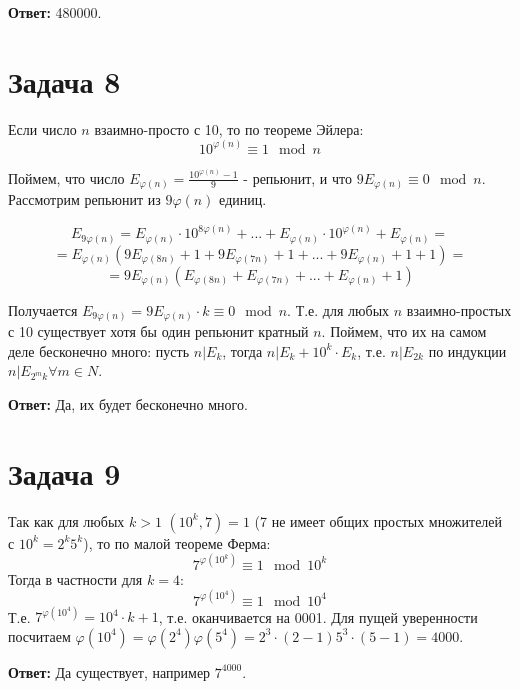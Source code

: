 \documentclass{article}
\begin{document}
		 \textbf{Ответ:} 480000.
		 
		 
		  \section {Задача 8}
		  
		  Если число $n$ взаимно-просто с 10, то по теореме Эйлера:
		  $$ 10^{\varphi(n)} \equiv 1 \mod n$$
		  
		  Поймем, что число $E_{\varphi(n)} = \frac{10^{\varphi(n)} - 1}{9}$ - репьюнит, и что $9E_{\varphi(n)} \equiv 0 \mod n$. Рассмотрим репьюнит из $9\varphi(n)$ единиц. 
		  
		  $$ E_{9\varphi(n)} = E_{\varphi(n)} \cdot 10^{8\varphi(n)} + ... + E_{\varphi(n)} \cdot 10^{\varphi(n)} + E_{\varphi(n)} = $$
		  $$=  E_{\varphi(n)} ( 9E_{\varphi(8n)} + 1 + 9E_{\varphi(7n)} + 1 + ... +  9E_{\varphi(n)} + 1 + 1) = $$
		  $$ = 9E_{\varphi(n)} (E_{\varphi(8n)} + E_{\varphi(7n)} + ... + E_{\varphi(n)} + 1)$$
		  
		  Получается $E_{9\varphi(n)} = 9E_{\varphi(n)} \cdot k \equiv 0 \mod n$. Т.е. для любых $n$ взаимно-простых с 10 существует хотя бы один репьюнит кратный $n$. Поймем, что их на самом деле бесконечно много: пусть $n | E_k$, тогда $n | E_k + 10^k \cdot E_k$, т.е. $n | E_{2k}$ по индукции $n | E_{2^mk} \forall m \in N$.
		  
		  \textbf{Ответ:} Да, их будет бесконечно много.
		  
		  \section {Задача 9}
		  Так как для любых $k > 1$ $(10^k, 7) = 1$ (7 не имеет общих простых множителей с $10^k=2^k5^k$), то по малой теореме Ферма:
			  $$ 7^{\varphi(10^k)} \equiv 1 \mod 10^k $$
		  Тогда в частности для $k=4:$
			  $$ 7^{\varphi(10^4)} \equiv 1 \mod 10^4 $$
		  Т.е. $7^{\varphi(10^4)} = 10^4\cdot k + 1$, т.е. оканчивается на 0001. Для пущей уверенности посчитаем $\varphi(10^4) = \varphi(2^4)\varphi(5^4) = 2^3\cdot(2 - 1) 5^3 \cdot(5 - 1) = 4000$.
		   
		  \textbf {Ответ:} Да существует, например $7^4000$.
\end{document}
